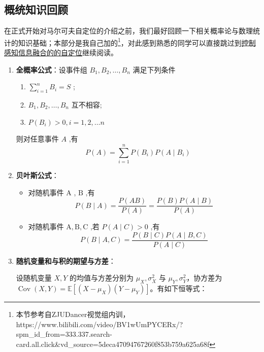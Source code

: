 \documentclass[../main.tex]{subfiles}
\begin{document}
\subsection*{概统知识回顾}
\hspace{2em}在正式开始对马尔可夫自定位的介绍之前，我们最好回顾一下相关概率论与数理统计的知识基础；本部分是我自己加的\footnote{本节参考自ZJUDancer视觉组内训，https://www.bilibili.com/video/BV1wUmPYCERx/?spm_id_from=333.337.search-card.all.click&vd_source=5deca47094767260f853b759a625a68f}，对此感到熟悉的同学可以直接跳过到\hyperref[sec:markov]{控制感知信息融合的的自定位}继续阅读。
    \begin{enumerate}
        \item \textbf{全概率公式}：设事件组 \( {B}_{1},{B}_{2},\ldots ,{B}_{n} \) 满足下列条件
        \begin{enumerate}
            \item \( \mathop{\sum }\limits_{{i = 1}}^{n}{B}_{i} = S \) ;
            \item \( {B}_{1},{B}_{2},\ldots ,{B}_{n} \) 互不相容;
            \item \( P\left( {B}_{i}\right)  > 0,i = 1,2,\ldots n \)
        \end{enumerate}
        则对任意事件 \( A \) ,有 
        $$ P\left( A\right)  = \mathop{\sum }\limits_{{i = 1}}^{n}P\left( {B}_{i}\right) P\left( {A \mid  {B}_{i}}\right) $$

        \item \textbf{贝叶斯公式}：
        \begin{itemize}
            \item 对随机事件 \( \mathrm{A} \) , \( \mathrm{B} \) ,有
            $$ P\left( {B \mid  A}\right)  = \frac{P\left( {AB}\right) }{P\left( A\right) } = \frac{P\left( B\right) P\left( {A \mid  B}\right) }{P\left( A\right) } $$
            \item 对随机事件 \( \mathrm{A},\mathrm{B},\mathrm{C} \) ,若 \( P\left( {A \mid  C}\right)  > 0 \) ,有
            $$ P\left( {B \mid  A,C}\right)  = \frac{P\left( {B \mid  C}\right) P\left( {A \mid  B,C}\right) }{P\left( {A \mid  C}\right) } $$
        \end{itemize}

        \item \textbf{随机变量和与积的期望与方差}：

    设随机变量 $X,Y$ 的均值与方差分别为 $\mu_X,\sigma_X^2$ 与 $\mu_Y,\sigma_Y^2$，协方差为
    $\operatorname{Cov}(X,Y)=\mathbb{E}[(X-\mu_X)(Y-\mu_Y)]$。有如下恒等式：
    

\end{enumerate}
\end{document}
